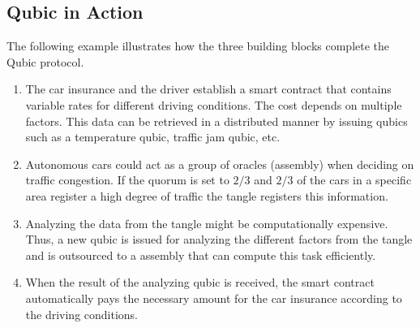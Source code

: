 \subsection{Qubic in Action}
The following example illustrates how the three building blocks complete the Qubic protocol.

\begin{enumerate}
    \item The car insurance and the driver establish a smart contract that contains variable rates for different driving conditions. The cost depends on multiple factors. This data can be retrieved in a distributed manner by issuing qubics such as a temperature qubic, traffic jam qubic, etc.
    \item Autonomous cars could act as a group of oracles (assembly) when deciding on traffic congestion. If the quorum is set to $2/3$ and $2/3$ of the cars in a specific area register a high degree of traffic the tangle registers this information.
    \item Analyzing the data from the tangle might be computationally expensive. Thus, a new qubic is issued for analyzing the different factors from the tangle and is outsourced to a assembly that can compute this task efficiently.
    \item When the result of the analyzing qubic is received, the smart contract automatically pays the necessary amount for the car insurance according to the driving conditions.
\end{enumerate}
